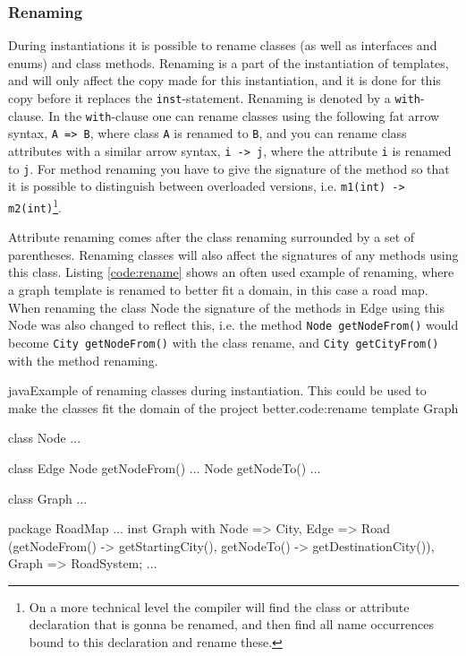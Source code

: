 \subsubsection{Renaming}

During instantiations it is possible to rename classes (as well as interfaces and enums) and class methods. Renaming is a part of the instantiation of templates, and will only affect the copy made for this instantiation, and it is done for this copy before it replaces the \verb|inst|-statement.
Renaming is denoted by a \verb|with|-clause.
In the \verb|with|-clause one can rename classes using the following fat arrow syntax, \verb|A => B|, where class \verb|A| is renamed to \verb|B|, and you can rename class attributes with a similar arrow syntax, \verb|i -> j|, where the attribute \verb|i| is renamed to \verb|j|.
For method renaming you have to give the signature of the method so that it is possible to distinguish between overloaded versions, i.e. \verb|m1(int) -> m2(int)|\footnote{On a more technical level the compiler will find the class or attribute declaration that is gonna be renamed, and then find all name occurrences bound to this declaration and rename these.}.


Attribute renaming comes after the class renaming surrounded by a set of parentheses.
Renaming classes will also affect the signatures of any methods using this class.
Listing \vref{code:rename} shows an often used example of renaming, where a graph template is renamed to better fit a domain, in this case a road map.
When renaming the class Node the signature of the methods in Edge using this Node was also changed to reflect this, i.e. the method \verb|Node getNodeFrom()| would become \verb|City getNodeFrom()| with the class rename, and \verb|City getCityFrom()| with the method renaming.

\begin{code}{java}{Example of renaming classes during instantiation. This could be used to make the classes fit the domain of the project better.}{code:rename}
template Graph {
    class Node {
        ...
    }

    class Edge {
        Node getNodeFrom() { ... }
        Node getNodeTo() { ... }
    }

    class Graph {
        ...
    }
}

package RoadMap {
    ...
    inst Graph with
        Node => City,
        Edge => Road
            (getNodeFrom() -> getStartingCity(),
            getNodeTo() -> getDestinationCity()),
        Graph => RoadSystem;
    ...
}

\end{code}

